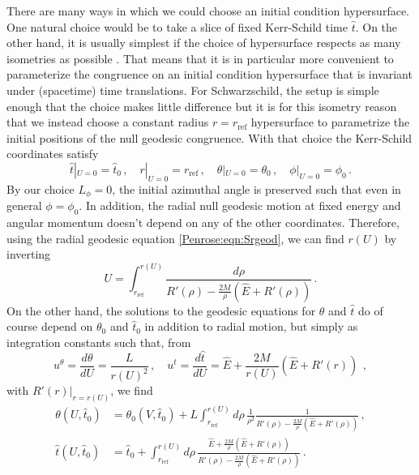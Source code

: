 There are many ways in which we could choose an initial condition hypersurface. One natural choice would be to take
a slice of fixed Kerr-Schild time $\hat{t}$. On the other hand, it is usually simplest if the choice of
hypersurface respects as many isometries as possible \cite{Papadopoulos:2020qik}. That means that it is in
particular more convenient to parameterize the congruence on an initial condition hypersurface that is invariant
under (spacetime) time translations. For Schwarzschild, the setup is simple enough that the choice makes little
difference but it is for this isometry reason that we instead choose a constant radius $r = r_{\mathrm{ref}}$ hypersurface to parametrize the initial positions of the null geodesic congruence. With that choice the Kerr-Schild coordinates satisfy
\begin{equation}
\hat{t}|_{U=0} = \hat{t}_0 \, , \quad r|_{U=0} = r_{\mathrm{ref}} \, , \quad 	\theta|_{U=0} = \theta_0 \, , \quad \phi|_{U=0} = \phi_0 \, .
\end{equation}
By our choice $L_{\phi} = 0$, the initial azimuthal angle is preserved such that even in general $\phi = \phi_0$. In addition, the radial null geodesic motion at fixed energy and angular momentum doesn't depend on any of the other coordinates. Therefore, using the radial geodesic equation \eqref{Penrose:eqn:Srgeod}, we can find $r(U)$ by inverting 
\begin{equation}\label{Penrose:eqn:SrUapp}
U = \int^{r(U)}_{r_{\mathrm{ref}}} \frac{d\rho}{R'(\rho) -\frac{2M}{\rho} \left(\hat{E}+R'(\rho)\right)} \, .
\end{equation}
On the other hand, the solutions to the geodesic equations for $\theta$ and $\hat{t}$ do of course depend on $\theta_0$ and $\hat{t}_0$ in addition to radial motion, but simply as integration constants such that, from
\begin{equation}
u^{\theta} = \frac{d\theta}{dU} = \frac{L}{r(U)^2} \, , \quad  	u^{\hat{t}} = \frac{d\hat{t}}{dU} = \hat{E}+\frac{2M}{r(U)} \left(\hat{E}+R'(r)\right)\ \, ,
\end{equation}
with $R'(r)|_{r=r(U)}$, we find
\begin{equation}\label{Penrose:eqn:StUapp}
\begin{aligned}
\theta(U, \hat{t}_0) &= \theta_0(V,\hat{t}_0)+ L\int^{r(U)}_{r_{\mathrm{ref}}} d\rho \, \frac{1}{\rho^2}\frac{1}{R'(\rho) -\frac{2M}{\rho} \left(\hat{E}+R'(\rho)\right)} \, ,\\
\hat{t}(U,\hat{t}_0) &= \hat{t}_0 + \int^{r(U)}_{r_{\mathrm{ref}}} d\rho \, \frac{\hat{E}+\frac{2M}{\rho} \left(\hat{E}+ R'(\rho)\right)}{R'(\rho) -\frac{2M}{\rho} \left(\hat{E}+R'(\rho)\right)} \, .
\end{aligned}
\end{equation}
